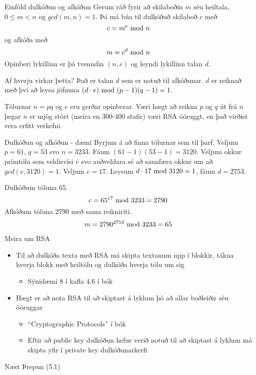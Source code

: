 \documentclass[handout]{beamer}
\begin{document}
\begin{frame}{Einföld dulkóðun og afkóðun}
Gerum ráð fyrir að skilaboðin $m$ séu heiltala, $0 \leq m < n$ og $gcd(m, n) = 1$. Þá má búa til dulkóðuð skilaboð $c$ með
\[
c = m^e \ \text{mod}\ n
\]
og afkóða með 
\[
 m = c^d \ \text{mod}\ n
\]
Opinberi lykillinn er þá tvenndin $(n, e)$ og leyndi lykillinn talan $d$.

\end{frame}

\begin{frame}{Af hverju virkar þetta?}
Það er talan $d$ sem er notuð til afkóðunar. $d$ er reiknað með því að leysa jöfnuna $(d\cdot e) \ \text{mod}\ (p-1)(q-1) = 1$.

Tölurnar $n = pq$ og $e$ eru gerðar opinberar. Væri hægt að reikna $p$ og $q$ út frá $n$ þegar $n$ er mjög stórt (meira en 300-400 stafir) væri RSA óöruggt, en það virðist vera erfitt verkefni.
\end{frame}

\begin{frame}{Dulkóðun og afkóðun - dæmi}
Byrjum á að finna tölurnar sem til þarf. Veljum $p=61$, $q = 53$ svo $n = 3233$. Fáum $(61 - 1)(53 - 1) = 3120$. Veljum okkur prímtölu sem veldisvísi $e$ svo auðveldara sé að sannfæra okkur um að $gcd(e,3120)=1$. Veljum $e = 17$. Leysum $d \cdot 17 \ \text{mod}\ 3120 = 1$, fáum $d = 2753$.

Dulkóðum töluna 65.
\[
 c = 65^{17} \ \text{mod}\ 3233 = 2790
\]
Afkóðum töluna 2790 með sama reikniriti.
\[
 m = 2790^{2753} \ \text{mod}\ 3233 = 65
\]
\end{frame}

\begin{frame}{Meira um RSA}
\begin{itemize}
 \item Til að dulkóða texta með RSA má skipta textanum upp í blokkir, tákna hverja blokk með heiltölu og dulkóða hverja tölu um sig
 \begin{itemize}
  \item Sýnidæmi 8 í kafla 4.6 í bók
 \end{itemize}
 \item Hægt er að nota RSA til að skiptast á lyklum þó að allar boðleiðir séu óöruggar
 \begin{itemize}
  \item ``Cryptographic Protocols'' í bók
  \item Eftir að public key dulkóðun hefur verið notuð til að skiptast á lyklum má skipta yfir í private key dulkóðunarkerfi
 \end{itemize}
\end{itemize}
\end{frame}

\begin{frame}{Næst}
Þrepun (5.1)
\end{frame}
\end{document}
